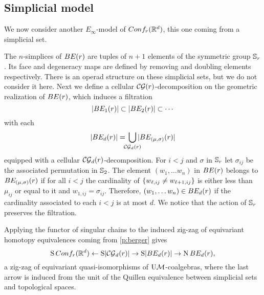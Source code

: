 \subsection{Simplicial model}\label{ss:simplicial model}

We now consider another $E_\infty$-model of $Conf_{r}(\mathbb{R}^{d})$, this one coming from a simplicial set.


The $n$-simplices of $BE(r)$ are tuples of $n+1$ elements of the symmetric group $\mathbb{S}_r$.
Its face and degeneracy maps are defined by removing and doubling elements respectively.
There is an operad structure on these simplicial sets, but we do not consider it here.
Next we define a cellular $\mathcal{CG}(r)$-decomposition on the geometric realization of $BE(r)$, which induces a filtration
\[
\lvert BE_1(r)\rvert \subset \lvert BE_2(r)\rvert \subset \dotsb
\]
with each
\[
\bars{\BE_d(r)} = \,
\bigcup_{\mathclap{\CG_d(r)}} \,
\bars{\BE_{(\mu,\sigma)}(r)}
\]
equipped with a cellular $\mathcal{CG}_d(r)$-decomposition.
For $i<j$ and $\sigma$ in $\mathbb{S}_r$ let $\sigma_{ij}$ be the associated permutation in $\mathbb{S}_2$.
The element $(w_1,\dots w_n)$ in $BE(r)$ belongs to $BE_{(\mu,\sigma)}(r)$ if for all $i<j$ the cardinality of $\{w_{\ell,ij} \neq w_{\ell+1,ij}\}$ is either less than $\mu_{ij}$ or equal to it and $w_{1,ij} = \sigma_{ij}$.
Therefore, $(w_1,\dots w_n) \in BE_{d}(r)$ if the cardinality associated to each $i<j$ is at most $d$.
We notice that the action of $\mathbb{S}_r$ preserves the filtration.

Applying the functor of singular chains to the induced zig-zag of equivariant homotopy equivalences coming from \cref{p:berger} gives
\begin{equation}\label{eq:simplicial zig-zag}
	\operatorname{S}Conf_{r}(\mathbb{R}^{d}) \leftarrow
	\operatorname{S}\lvert\mathcal{CG}_d(r)\rvert \to
	\operatorname{S}\lvert BE_d(r)\rvert \to
	\operatorname{N} BE_d(r),
\end{equation}
a zig-zag of equivariant quasi-isomorphisms of $\mathrm{U}\mathcal{M}$-coalgebras, where the last arrow is induced from the unit of the Quillen equivalence between simplicial sets and topological spaces.

